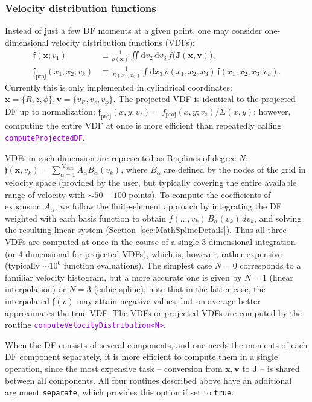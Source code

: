 \documentclass[12pt]{article}
\newcommand{\ttt}[1]{\textcolor{darkviolet}{\texttt{#1}}}
\newcommand{\ppp}[1]{\textcolor{darkolive} {\texttt{#1}}}
\renewcommand{\d}{\mathrm{d}}
\newcommand{\bv}{\boldsymbol{v}}
\newcommand{\bx}{\boldsymbol{x}}
\newcommand{\bJ}{\boldsymbol{J}}
\begin{document}
\subsubsection{Velocity distribution functions}  \label{sec:VDF}

Instead of just a few DF moments at a given point, one may consider one-dimensional velocity distribution functions (VDFs):
\begin{align*}
\mathfrak{f}(\bx;v_1) &\equiv \frac{1}{\rho(\bx)} \iint \d v_2\,\d v_3\, f\big(\bJ(\bx,\bv)\big) ,\\
\mathfrak{f}_\mathrm{proj}(x_1,x_2;v_k) &\equiv \frac{1}{\Sigma(x_1,x_2)} \int \d x_3\, \rho(x_1,x_2,x_3)\,\mathfrak{f}(x_1,x_2,x_3;v_k) .
\end{align*}
Currently this is only implemented in cylindrical coordinates: $\bx=\{R,z,\phi\}, \bv=\{v_R,v_z,v_\phi\}$. The projected VDF is identical to the projected DF up to normalization: $\mathfrak{f}_\mathrm{proj}(x,y;v_z) = f_\mathrm{proj}(x,y;v_z) / \Sigma(x,y)$; however, computing the entire VDF at once is more efficient than repeatedly calling \ttt{computeProjectedDF}.

VDFs in each dimension are represented as B-splines of degree $N$: $\mathfrak{f}(\bx, v_k) = \sum_{\alpha=1}^{N_\mathrm{basis}} A_\alpha B_\alpha(v_k)$, where $B_\alpha$ are defined by the nodes of the grid in velocity space (provided by the user, but typically covering the entire available range of velocity with $\sim 50-100$ points). To compute the coefficients of expansion $A_\alpha$, we follow the finite-element approach by integrating the DF weighted with each basis function to obtain $f(\dots,v_k)\,B_\alpha(v_k)\,dv_k$, and solving the resulting linear system (Section~\ref{sec:MathSplineDetails}). Thus all three VDFs are computed at once in the course of a single 3-dimensional integration (or 4-dimensional for projected VDFs), which is, however, rather expensive (typically $\sim 10^6$ function evaluations). The simplest case $N=0$ corresponds to a familiar velocity histogram, but a more accurate one is given by $N=1$ (linear interpolation) or $N=3$ (cubic spline); note that in the latter case, the interpolated $\mathfrak{f}(v)$ may attain negative values, but on average better approximates the true VDF.
The VDFs or projected VDFs are computed by the routine \ttt{computeVelocityDistribution<N>}.

When the DF consists of several components, and one needs the moments of each DF component separately, it is more efficient to compute them in a single operation, since the most expensive task -- conversion from $\bx,\bv$ to $\bJ$ -- is shared between all components. All four routines described above have an additional argument \ppp{separate}, which provides this option if set to \texttt{true}.
\end{document}
